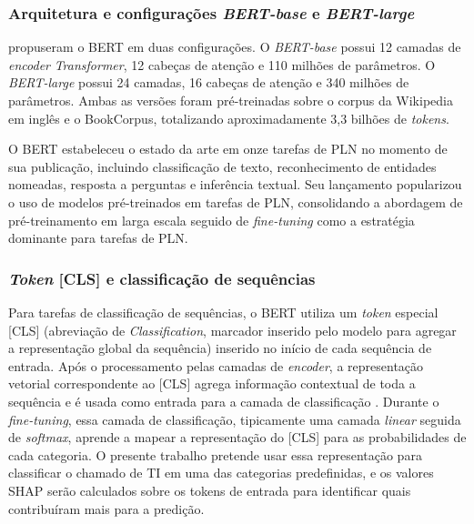 \documentclass[
    12pt,                %
    openright,           %
    oneside,             %
    a4paper,             %
    english,             %
    brazil               %
]{abntex2}
\begin{document}
\subsubsection{Arquitetura e configurações \textit{BERT-base} e \textit{BERT-large}}
\label{subsubsec:bert_arquitetura}

 propuseram o BERT em duas configurações. O \textit{BERT-base} possui 12 camadas de \textit{encoder} \textit{Transformer}, 12 cabeças de atenção e 110 milhões de parâmetros. O \textit{BERT-large} possui 24 camadas, 16 cabeças de atenção e 340 milhões de parâmetros. Ambas as versões foram pré-treinadas sobre o corpus da Wikipedia em inglês e o BookCorpus, totalizando aproximadamente 3,3 bilhões de \textit{tokens}.

O BERT estabeleceu o estado da arte em onze tarefas de PLN no momento 
de sua publicação, incluindo classificação de texto, reconhecimento 
de entidades nomeadas, resposta a perguntas e inferência textual. 
Seu lançamento popularizou o uso de modelos pré-treinados em tarefas 
de PLN, consolidando a abordagem de pré-treinamento em larga escala 
seguido de \textit{fine-tuning} como a estratégia dominante para 
tarefas de PLN.

\subsubsection{\textit{Token} [CLS] e classificação de sequências}
\label{subsubsec:bert_cls}

Para tarefas de classificação de sequências, o BERT utiliza um \textit{token} especial [CLS] (abreviação de \textit{Classification}, marcador inserido pelo modelo para agregar a representação global da sequência) inserido no início de cada sequência de entrada. Após o processamento pelas camadas de \textit{encoder}, a representação vetorial correspondente ao [CLS] agrega informação contextual de toda a sequência e é usada como entrada para a camada de classificação \cite{devlin2019}. Durante o \textit{fine-tuning}, essa camada de classificação, tipicamente uma camada \textit{linear} seguida de \textit{softmax}, aprende a mapear a representação do [CLS] para as probabilidades de cada categoria. O presente trabalho pretende usar essa representação para classificar o chamado de TI em uma das categorias predefinidas, e os valores SHAP serão calculados sobre os tokens de entrada para identificar quais contribuíram mais para a predição.
\end{document}
